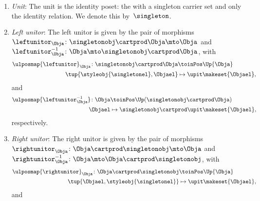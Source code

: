 \begin{lemma}
\begin{enumerate}
        \item \emph{Unit}: The unit is the identity poset: the  with a singleton carrier set and only the identity relation.
              We denote this by~$\singleton$.
        \item \emph{Left unitor}: The left unitor is given by the pair of morphisms~$\leftunitor_\Obja\colon \singletonobj\cartprod \Obja \mto \Obja$ and~$\leftunitor_\Obja^{-1}\colon \Obja \mto \singletonobj\cartprod \Obja$, with
              \begin{equation}
                  \begin{aligned}
                      \ulposmap{\leftunitor}_\Obja\colon \singletonobj\cartprod \Obja & \toinPos \Up{\Obja} \\
                      \tup{\styleobj{\singletonel},\Objael}                           & \mapsto \upit\makeset{\Objael},
                  \end{aligned}
              \end{equation}
              and
              \begin{equation}
                  \begin{aligned}
                      \ulposmap{\leftunitor_{\Obja}^{-1}}\colon \Obja & \toinPos \Up(\singletonobj\cartprod \Obja) \\
                      \Objael                                         & \mapsto \singletonobj \cartprod \upit \makeset{\Objael},
                  \end{aligned}
              \end{equation}
              respectively.
        \item \emph{Right unitor}: The right unitor is given by the pair of morphisms~$\rightunitor_\Obja\colon \Obja\cartprod \singletonobj  \mto \Obja$ and~$\rightunitor_\Obja^{-1}\colon \Obja \mto \Obja \cartprod \singletonobj$, with
              \begin{equation}
                  \begin{aligned}
                      \ulposmap{\rightunitor}_\Obja\colon \Obja\cartprod \singletonobj & \toinPos \Up{\Obja} \\
                      \tup{\Objael,\styleobj{\singletonel}}                            & \mapsto \upit\makeset{\Objael},
                  \end{aligned}
              \end{equation}
              and
              \begin{equation}
                  \begin{aligned}

\end{aligned}
\end{equation}
\end{enumerate}
\end{lemma}
